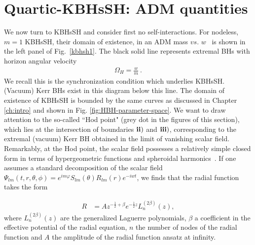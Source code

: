 \section{Quartic-KBHsSH: ADM quantities}
\label{sec_III}
We now turn to KBHsSH and consider first no self-interactions. For nodeless, $m=1$ KBHsSH, their domain of existence, in an ADM mass $vs.$ $w$~\cite{Herdeiro:2014goa,Herdeiro:2015gia} is shown in the left panel of Fig.~\ref{kbhsh1}.  The black solid line represents extremal BHs {with horizon angular velocity}
\begin{eqnarray}
\label{SIcond}
 \Omega_H=\frac{w}{m} \ .
\end{eqnarray} 
We recall this is the synchronization condition which underlies KBHsSH. (Vacuum) Kerr BHs exist in this diagram below this line.
The domain of existence of KBHsSH is bounded by the same curves as discussed in Chapter \ref{ch:intro} and shown in Fig. \ref{fig:HBH-parameter-space}.
We want to draw attention to the so-called ``Hod point" (grey dot in the figures of this section), which lies at the intersection of boundaries ${\bf ii)}$ and ${\bf iii)}$, corresponding to the extremal (vacuum) Kerr BH obtained in the limit of vanishing scalar field.
Remarkably, at the Hod point, the scalar field possesses a relatively simple closed form in terms of hypergeometric functions and spheroidal harmonics~\cite{Hod:2012px}.
If one assumes a standard decomposition of the scalar field $\Psi_{lm}(t,r,\theta,\phi)=e^{im\varphi}S_{lm}(\theta)R_{lm}(r)e^{-iwt}$, we finds that the radial function takes the form

\begin{align*}
  R &= Az^{-\frac{1}{2}+\beta}e^{-\frac{1}{2}z}L_n^{(2\beta)}(z),
\end{align*}
where $L_n^{(2\beta)}(z)$ are the generalized Laguerre polynomials, $\beta$ a coefficient in the effective potential of the radial equation, $n$ the number of nodes of the radial function and $A$ the amplitude of the radial function ansatz at infinity.


